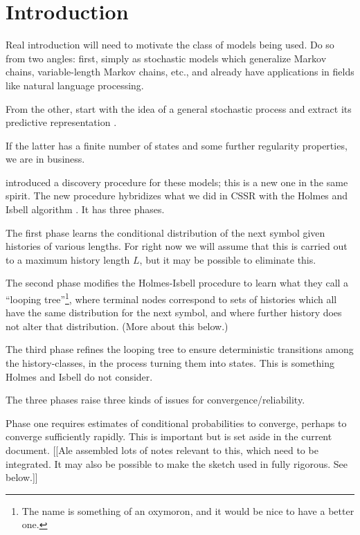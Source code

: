 \documentclass[../new-procedure.tex]{subfiles}
\begin{document}
\section{Introduction}

Real introduction will need to motivate the class of models being used. Do so
from two angles: first, simply as stochastic models which generalize Markov
chains, variable-length Markov chains, etc., and already have applications in
fields like natural language processing.

From the other, start with the idea of a general stochastic process and extract
its predictive representation
\cite{Knight-predictive-view,Knight-foundations-of-prediction,CMPPSS,predictive-representations-of-state}.

If the latter has a finite number of states and some further regularity
properties, we are in business.

\cite{CSSR-for-UAI} introduced a discovery procedure for these models;
this is a new one in the same spirit. The new procedure hybridizes what we did
in CSSR \cite{CSSR-for-UAI} with the Holmes and Isbell algorithm
\cite{Holmes-Isbell-looping}. It has three phases.

The first phase learns the conditional distribution of the next symbol given
histories of various lengths. For right now we will assume that this is
carried out to a maximum history length $L$, but it may be possible to
eliminate this.

The second phase modifies the Holmes-Isbell procedure to learn what they call a
``looping tree''\footnote{The name is something of an oxymoron, and it would be
  nice to have a better one.}, where terminal nodes correspond to sets of
histories which all have the same distribution for the next symbol, and where
further history does not alter that distribution. (More about this below.)

The third phase refines the looping tree to ensure deterministic transitions
among the history-classes, in the process turning them into states. This is
something Holmes and Isbell do not consider.

The three phases raise three kinds of issues for convergence/reliability.

Phase one requires estimates of conditional probabilities to converge, perhaps
to converge sufficiently rapidly. This is important but is set aside in the
current document. [[Ale assembled lots of notes relevant to this, which need
to be integrated. It may also be possible to make the sketch used in
\cite{CSSR-for-UAI} fully rigorous. See below.]]
\end{document}
